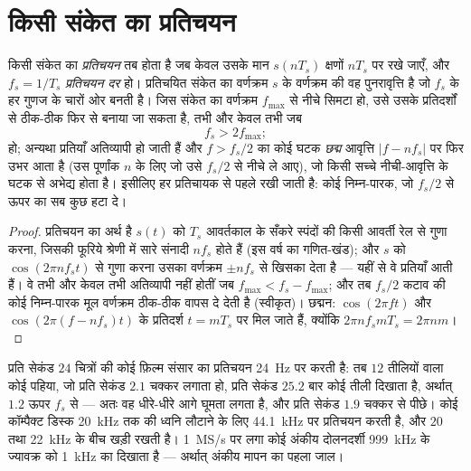 \section{किसी संकेत का प्रतिचयन}

\begin{theorem}[प्रतिचयन; नाइक्विस्ट--शैनन कसौटी]\label{thm:b2:feedback-oscillators:shannon}
किसी संकेत का \emph{प्रतिचयन} तब होता है जब केवल उसके मान $s(nT_s)$
क्षणों $nT_s$ पर रखे जाएँ, और $f_s = 1/T_s$ \emph{प्रतिचयन दर} हो।
प्रतिचयित संकेत का वर्णक्रम $s$ के वर्णक्रम की वह पुनरावृत्ति है जो
$f_s$ के हर गुणज के चारों ओर बनती है। जिस संकेत का वर्णक्रम
$f_{\max}$ से नीचे सिमटा हो, उसे उसके प्रतिदर्शों से ठीक-ठीक फिर से बनाया
जा सकता है, तभी और केवल तभी जब
\[
f_s > 2f_{\max} ;
\]
हो; अन्यथा प्रतियाँ अतिव्यापी हो जाती हैं और $f > f_s/2$ का कोई घटक
\emph{छद्म} आवृत्ति $|f - nf_s|$ पर फिर उभर आता है (उस पूर्णांक $n$ के लिए जो
उसे $f_s/2$ से नीचे ले आए), जो किसी सच्चे नीची-आवृत्ति के घटक से
अभेद्य होता है। इसीलिए हर प्रतिचायक से पहले \emph{}
रखी जाती है: कोई निम्न-पारक, जो $f_s/2$ से ऊपर का सब कुछ हटा दे।
\end{theorem}

\begin{proof}
प्रतिचयन का अर्थ है $s(t)$ को $T_s$ आवर्तकाल के सँकरे स्पंदों की किसी
आवर्ती रेल से गुणा करना, जिसकी फूरिये श्रेणी में सारे संनादी $nf_s$ होते हैं
(इस वर्ष का गणित-खंड); और $s$ को $\cos(2\pi nf_st)$ से गुणा करना
उसका वर्णक्रम $\pm nf_s$ से खिसका देता है --- यहीं से वे प्रतियाँ आती हैं। वे तभी और केवल तभी
अतिव्यापी नहीं होतीं जब $f_{\max} < f_s - f_{\max}$; और तब $f_s/2$ कटाव की कोई निम्न-पारक
मूल वर्णक्रम ठीक-ठीक वापस दे देती है (स्वीकृत)। छद्मन:
$\cos(2\pi ft)$ और $\cos(2\pi(f - nf_s)t)$ के प्रतिदर्श
$t = mT_s$ पर मिल जाते हैं, क्योंकि $2\pi nf_smT_s = 2\pi nm$।
\end{proof}

\begin{example}[गाड़ी के पहिये, सीडी और दोलनदर्शी]\label{ex:b2:feedback-oscillators:alias}
प्रति सेकंड $24$ चित्रों की कोई फ़िल्म संसार का प्रतिचयन \qty{24}{Hz} पर करती है: तब
$12$ तीलियों वाला कोई पहिया, जो प्रति सेकंड $2.1$ चक्कर लगाता हो, प्रति सेकंड
$25.2$ बार कोई तीली दिखाता है, अर्थात् $1.2$ ऊपर $f_s$ से --- अतः वह धीरे-धीरे
आगे घूमता लगता है, और प्रति सेकंड $1.9$ चक्कर से पीछे। कोई कॉम्पैक्ट डिस्क
\qty{20}{kHz} तक की ध्वनि लौटाने के लिए \qty{44.1}{kHz} पर प्रतिचयन करती है, और
$20$ तथा \qty{22}{kHz} के बीच खड़ी  रखती है। \qty{1}{MS/s} पर लगा कोई
अंकीय दोलनदर्शी \qty{999}{kHz} के ज्यावक्र को \qty{1}{kHz} का दिखाता है ---
अर्थात् अंकीय मापन का पहला जाल।
\end{example}

